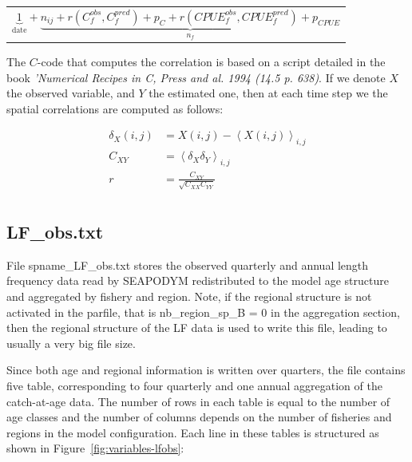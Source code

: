 \begin{table} [H]
\begin{center}
\begin{tabular}{c}
$
\underbrace{1}_{\text{date}}+\underbrace{n_{ij}+r(C^{obs}_f,C^{pred}_f)+p_C+r(CPUE^{obs}_f,CPUE^{pred}_f)+p_{CPUE}}_{n_f}
$\\
\end{tabular}
\label{fig:variables-spcorr}
\end{center}
\end{table}

The $C$-code that computes the correlation is based on a script detailed in the book \textit{'Numerical Recipes in C, Press and al. 1994 (14.5 p. 638)}. 
If we denote $X$ the observed variable, and $Y$ the estimated one, then at each time step we the spatial correlations are computed as follows:

\begin{align*}
\delta_X\left(i,j\right) &= X\left(i,j\right)-\left< X\left(i,j\right)\right>_{i,j} \\
C_{XY} &= \left<\delta_X\delta_Y\right>_{i,j} \\
r &= \frac{C_{XY}}{\sqrt{C_{XX}C_{YY}}} \\
\end{align*}

\subsection{LF\_obs.txt}\label{annex:lfobs}
File {\ttfamily spname\_LF\_obs.txt} stores the observed quarterly and annual length frequency data read by SEAPODYM redistributed to the model age structure and aggregated by fishery and region. Note, if the regional structure is not activated in the parfile, that is {\ttfamily nb\_region\_sp\_B = 0} in the aggregation section, then the regional structure of the LF data is used to write this file, leading to usually a very big file size. 

Since both age and regional information is written over quarters, the file contains five table, corresponding to four quarterly and one annual aggregation of the catch-at-age data. The number of rows in each table is equal to the number of age classes and the number of columns depends on the number of fisheries and regions in the model configuration. Each line in these tables is structured as shown in Figure~\ref{fig:variables-lfobs}: 

